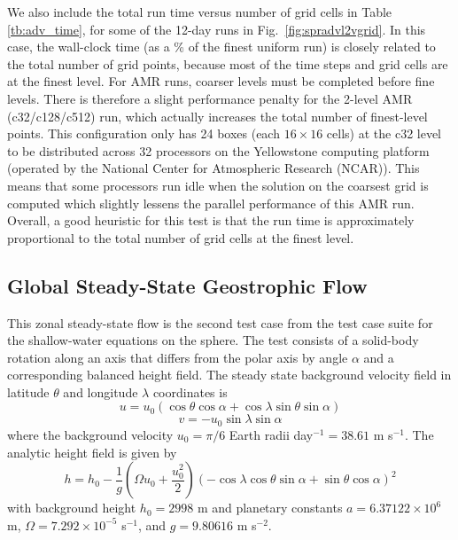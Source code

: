 %
We also include the total run time versus number of grid cells in 
Table 
\ref{tb:adv_time},
for some of the 12-day runs  in
Fig.~\ref{fig:spradvl2vgrid}.
In this case, the wall-clock time (as a \% of the finest uniform run)
is closely related to the total number of grid points, because most of
the time steps and grid cells are at the finest level.
For AMR runs, coarser levels must be completed before fine levels.
There is therefore a slight performance penalty for the 2-level AMR (c32/c128/c512)
run, which actually increases the total number of finest-level points. This configuration
only has 24 boxes (each $16\times16$ cells) at the c32 level to be
distributed across 32 processors on the Yellowstone computing platform (operated 
by the National Center for Atmospheric Research (NCAR)). This means that some processors run idle when the
solution on the coarsest grid is computed which slightly lessens the parallel performance
of this AMR run.
Overall, a good heuristic for this test is that the run time is 
approximately proportional to the total number of grid cells at the
finest level.

\subsection{Global Steady-State Geostrophic Flow} 
\label{subsec:steady-state}

This zonal
steady-state flow is the second test case from the
\cite{Williamson:1992kx} test case suite for the shallow-water equations
on the sphere.  The test consists of a solid-body rotation along an axis
that differs from the polar axis by angle $\alpha$ and a corresponding
balanced height field. The steady state background velocity field in
latitude $\theta$ and longitude $\lambda$ coordinates is
\begin{equation}
    \label{eq:test2u} u = u_0\left(\cos\theta \cos\alpha +
       \cos\lambda \sin\theta\sin\alpha\right)
\end{equation}
 \begin{equation}
    \label{eq:test2v} v = -u_0 \sin\lambda \sin\alpha
\end{equation}
 where the background velocity $u_0 = \pi / 6$ Earth radii day$^{-1} = 38.61$
 m s$^{-1}$. The analytic height field is given by
\begin{equation}
    \label{eq:test2h} h = h_0 - \frac{1}{g}\left(\Omega u_0 +\frac{u_0^{2}}{2}\right)
        \left(-\cos\lambda \cos\theta \sin\alpha + \sin\theta \cos\alpha\right)^2
\end{equation}
with background height $h_0 = 2998$ m and planetary 
constants $a=6.37122 \times 10^6$ m, $\Omega = 7.292 \times 10^{-5}$ s$^{-1}$,
and $g = 9.80616$ m s$^{-2}$.

